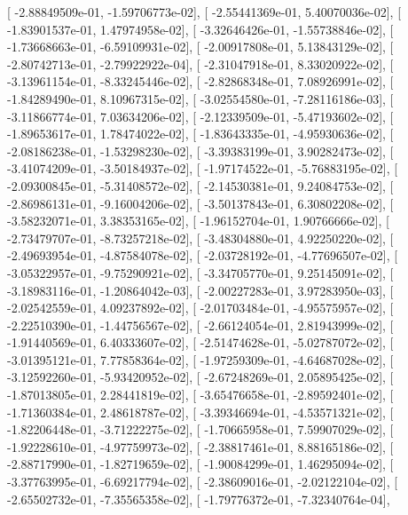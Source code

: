 \documentclass{article}
\begin{document}
       [ -2.88849509e-01,  -1.59706773e-02],
       [ -2.55441369e-01,   5.40070036e-02],
       [ -1.83901537e-01,   1.47974958e-02],
       [ -3.32646426e-01,  -1.55738846e-02],
       [ -1.73668663e-01,  -6.59109931e-02],
       [ -2.00917808e-01,   5.13843129e-02],
       [ -2.80742713e-01,  -2.79922922e-04],
       [ -2.31047918e-01,   8.33020922e-02],
       [ -3.13961154e-01,  -8.33245446e-02],
       [ -2.82868348e-01,   7.08926991e-02],
       [ -1.84289490e-01,   8.10967315e-02],
       [ -3.02554580e-01,  -7.28116186e-03],
       [ -3.11866774e-01,   7.03634206e-02],
       [ -2.12339509e-01,  -5.47193602e-02],
       [ -1.89653617e-01,   1.78474022e-02],
       [ -1.83643335e-01,  -4.95930636e-02],
       [ -2.08186238e-01,  -1.53298230e-02],
       [ -3.39383199e-01,   3.90282473e-02],
       [ -3.41074209e-01,  -3.50184937e-02],
       [ -1.97174522e-01,  -5.76883195e-02],
       [ -2.09300845e-01,  -5.31408572e-02],
       [ -2.14530381e-01,   9.24084753e-02],
       [ -2.86986131e-01,  -9.16004206e-02],
       [ -3.50137843e-01,   6.30802208e-02],
       [ -3.58232071e-01,   3.38353165e-02],
       [ -1.96152704e-01,   1.90766666e-02],
       [ -2.73479707e-01,  -8.73257218e-02],
       [ -3.48304880e-01,   4.92250220e-02],
       [ -2.49693954e-01,  -4.87584078e-02],
       [ -2.03728192e-01,  -4.77696507e-02],
       [ -3.05322957e-01,  -9.75290921e-02],
       [ -3.34705770e-01,   9.25145091e-02],
       [ -3.18983116e-01,  -1.20864042e-03],
       [ -2.00227283e-01,   3.97283950e-03],
       [ -2.02542559e-01,   4.09237892e-02],
       [ -2.01703484e-01,  -4.95575957e-02],
       [ -2.22510390e-01,  -1.44756567e-02],
       [ -2.66124054e-01,   2.81943999e-02],
       [ -1.91440569e-01,   6.40333607e-02],
       [ -2.51474628e-01,  -5.02787072e-02],
       [ -3.01395121e-01,   7.77858364e-02],
       [ -1.97259309e-01,  -4.64687028e-02],
       [ -3.12592260e-01,  -5.93420952e-02],
       [ -2.67248269e-01,   2.05895425e-02],
       [ -1.87013805e-01,   2.28441819e-02],
       [ -3.65476658e-01,  -2.89592401e-02],
       [ -1.71360384e-01,   2.48618787e-02],
       [ -3.39346694e-01,  -4.53571321e-02],
       [ -1.82206448e-01,  -3.71222275e-02],
       [ -1.70665958e-01,   7.59907029e-02],
       [ -1.92228610e-01,  -4.97759973e-02],
       [ -2.38817461e-01,   8.88165186e-02],
       [ -2.88717990e-01,  -1.82719659e-02],
       [ -1.90084299e-01,   1.46295094e-02],
       [ -3.37763995e-01,  -6.69217794e-02],
       [ -2.38609016e-01,  -2.02122104e-02],
       [ -2.65502732e-01,  -7.35565358e-02],
       [ -1.79776372e-01,  -7.32340764e-04],
\end{document}

